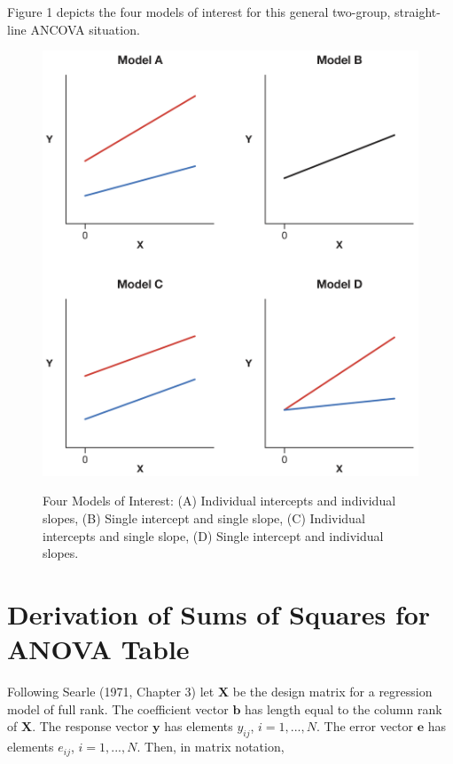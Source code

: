 \documentclass[11pt, oneside]{article}   	%
\begin{document}
Figure 1 depicts the four models of interest for this general two-group, straight-line ANCOVA situation. 
\begin{center}
\begin{figure}
\includegraphics[scale = 0.9]{205940_Slope_Intercept_Graphs_Labels.png} 
\label{Fig. 1}
\caption{Four Models of Interest: (A) Individual intercepts and individual slopes, (B) Single intercept and single slope, (C) Individual intercepts and single slope, (D) Single intercept and individual slopes.}
\end{figure}
\end{center}

\section{Derivation of Sums of Squares for ANOVA Table}
Following Searle (1971, Chapter 3) let $\mathbf{X}$ be the design matrix for a regression model of full rank.  The coefficient vector $\mathbf{b}$ has length equal to the column rank of $\mathbf{X}$.  The response vector $\mathbf{y}$ has elements $y_{ij}$, $i = 1, ..., N$. The error vector  $\mathbf{e}$ has elements $e_{ij}$, $i = 1, ..., N $.  Then, in matrix notation,  
\end{document}
